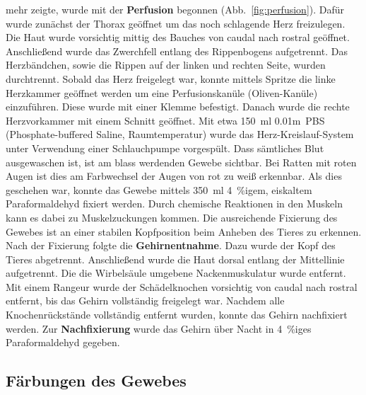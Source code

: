 mehr zeigte, wurde mit der \textbf{Perfusion} begonnen (Abb.~\ref{fig:perfusion}). Dafür wurde zunächst der Thorax geöffnet um das noch schlagende Herz freizulegen. Die Haut wurde vorsichtig mittig des Bauches von caudal nach rostral geöffnet. Anschließend wurde das Zwerchfell entlang des Rippenbogens aufgetrennt. Das Herzbändchen, sowie die Rippen auf der linken und rechten Seite, wurden durchtrennt. Sobald das Herz freigelegt war, konnte mittels Spritze die linke Herzkammer geöffnet werden um eine Perfusionskanüle (Oliven-Kanüle) einzuführen. Diese wurde mit einer Klemme befestigt. Danach wurde die rechte Herzvorkammer mit einem Schnitt geöffnet. Mit etwa 150~ml 0.01m~PBS (Phosphate-buffered Saline, Raumtemperatur) wurde das Herz-Kreislauf-System unter Verwendung einer Schlauchpumpe vorgespült. Dass sämtliches Blut ausgewaschen ist, ist am blass werdenden Gewebe sichtbar. Bei Ratten mit roten Augen ist dies am Farbwechsel der Augen von rot zu weiß erkennbar. Als dies geschehen war, konnte das Gewebe mittels 350~ml 4~\%igem, eiskaltem Paraformaldehyd fixiert werden. Durch chemische Reaktionen in den Muskeln kann es dabei zu Muskelzuckungen kommen. Die ausreichende Fixierung des Gewebes ist an einer stabilen Kopfposition beim Anheben des Tieres zu erkennen.
\noindent Nach der Fixierung folgte die \textbf{Gehirnentnahme}. Dazu wurde der Kopf des Tieres abgetrennt. Anschließend wurde die Haut dorsal entlang der Mittellinie aufgetrennt. Die die Wirbelsäule umgebene Nackenmuskulatur wurde entfernt. Mit einem Rangeur wurde der Schädelknochen vorsichtig von caudal nach rostral entfernt, bis das Gehirn vollständig freigelegt war. Nachdem alle Knochenrückstände vollständig entfernt wurden, konnte das Gehirn nachfixiert werden. Zur \textbf{Nachfixierung} wurde das Gehirn über Nacht in 4~\%iges Paraformaldehyd gegeben.

\subsection{Färbungen des Gewebes}

